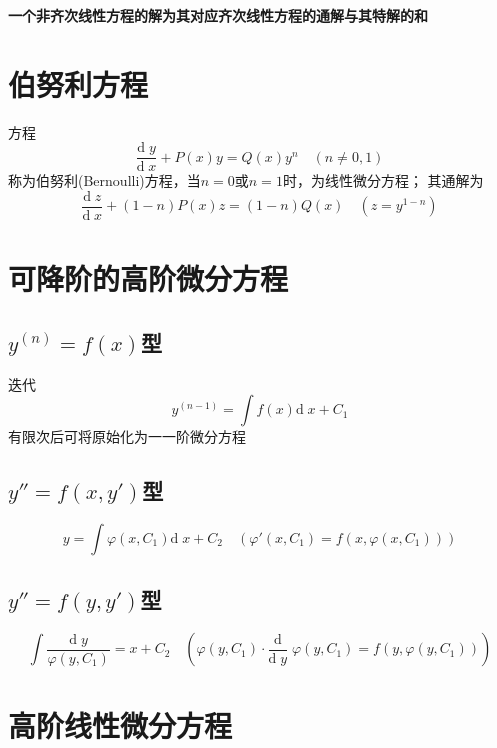 \documentclass[UTF8]{ctexart}
\newcommand{\dif}[1]{\text{d}\;\!#1}
\newcommand{\dev}[1]{\frac{\text{d}}{\dif{#1}}\;\!}
\begin{document}
\textbf{一个非齐次线性方程的解为其对应齐次线性方程的通解与其特解的和}

\section*{伯努利方程}

方程
\[\frac{\dif{y}}{\dif{x}}+P(x)y=Q(x)y^n\quad(n\ne0,1)\]
称为伯努利(Bernoulli)方程，当$n=0$或$n=1$时，为线性微分方程；
其通解为
\[ \frac{\dif{z}}{\dif{x}}+(1-n)P(x)z=(1-n)Q(x)\quad(z=y^{1-n}) \]

\section*{可降阶的高阶微分方程}

\subsection*{$y^{(n)}=f(x)$型}
迭代
\[y^{(n-1)}=\int f(x)\dif{x}+C_1\]
有限次后可将原始化为一一阶微分方程

\subsection*{$y''=f(x,y')$型}
\[y=\int\varphi(x,C_1)\dif{x}+C_2\quad(\varphi'(x,C_1)=f(x,\varphi(x,C_1)))\]

\subsection*{$y''=f(y,y')$型}
\[\int\frac{\dif{y}}{\varphi(y,C_1)}=x+C_2\quad(\varphi(y,C_1)\cdot\dev{y}\varphi(y,C_1)=f(y,\varphi(y,C_1)))\]
\bigskip
\bigskip

\section*{高阶线性微分方程}

\bigskip
\end{document}
